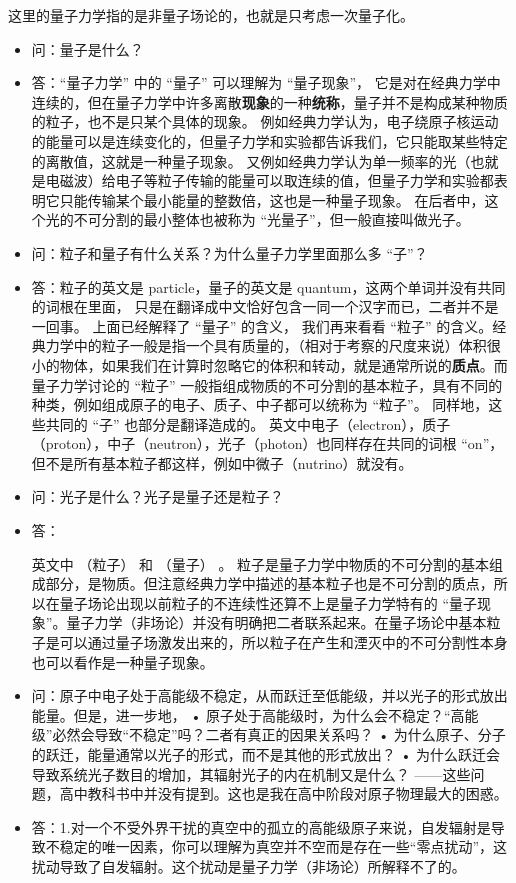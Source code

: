 
\begin{issues}
\issueDraft
\end{issues}

这里的量子力学指的是非量子场论的，也就是只考虑一次量子化。

\begin{itemize}
\item  问：量子是什么？
\item 答：“量子力学” 中的 “量子” 可以理解为 “量子现象”， 它是对在经典力学中连续的，但在量子力学中许多离散\textbf{现象}的一种\textbf{统称}，量子并不是构成某种物质的粒子，也不是只某个具体的现象。 例如经典力学认为，电子绕原子核运动的能量可以是连续变化的，但量子力学和实验都告诉我们，它只能取某些特定的离散值，这就是一种量子现象。 又例如经典力学认为单一频率的光（也就是电磁波）给电子等粒子传输的能量可以取连续的值，但量子力学和实验都表明它只能传输某个最小能量的整数倍，这也是一种量子现象。 在后者中，这个光的不可分割的最小整体也被称为 “光量子”，但一般直接叫做光子。

\item 问：粒子和量子有什么关系？为什么量子力学里面那么多 “子”？
\item 答：粒子的英文是 particle，量子的英文是 quantum，这两个单词并没有共同的词根在里面， 只是在翻译成中文恰好包含一同一个汉字而已，二者并不是一回事。 上面已经解释了 “量子” 的含义， 我们再来看看 “粒子” 的含义。经典力学中的粒子一般是指一个具有质量的，（相对于考察的尺度来说）体积很小的物体，如果我们在计算时忽略它的体积和转动，就是通常所说的\textbf{质点}。而量子力学讨论的 “粒子” 一般指组成物质的不可分割的基本粒子，具有不同的种类，例如组成原子的电子、质子、中子都可以统称为 “粒子”。 同样地，这些共同的 “子” 也部分是翻译造成的。 英文中电子（electron），质子（proton），中子（neutron），光子（photon）也同样存在共同的词根 “on”， 但不是所有基本粒子都这样，例如中微子（nutrino）就没有。

\item 问：光子是什么？光子是量子还是粒子？
\item 答：



英文中 （粒子） 和 （量子） 。 粒子是量子力学中物质的不可分割的基本组成部分，是物质。但注意经典力学中描述的基本粒子也是不可分割的质点，所以在量子场论出现以前粒子的不连续性还算不上是量子力学特有的 “量子现象”。量子力学（非场论）并没有明确把二者联系起来。在量子场论中基本粒子是可以通过量子场激发出来的，所以粒子在产生和湮灭中的不可分割性本身也可以看作是一种量子现象。
\item 问：原子中电子处于高能级不稳定，从而跃迁至低能级，并以光子的形式放出能量。但是，进一步地，
• 原子处于高能级时，为什么会不稳定？“高能级”必然会导致“不稳定”吗？二者有真正的因果关系吗？
• 为什么原子、分子的跃迁，能量通常以光子的形式，而不是其他的形式放出？
• 为什么跃迁会导致系统光子数目的增加，其辐射光子的内在机制又是什么？
——这些问题，高中教科书中并没有提到。这也是我在高中阶段对原子物理最大的困惑。
\item 答：1.对一个不受外界干扰的真空中的孤立的高能级原子来说，自发辐射是导致不稳定的唯一因素，你可以理解为真空并不空而是存在一些“零点扰动”，这扰动导致了自发辐射。这个扰动是量子力学（非场论）所解释不了的。


\end{itemize}
